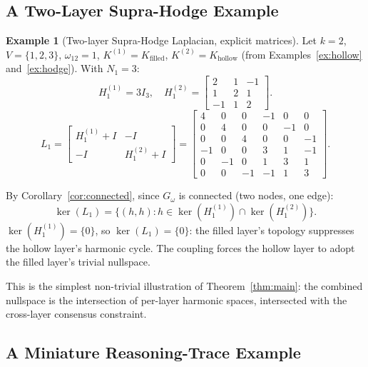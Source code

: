 \documentclass[11pt]{article}
\theoremstyle{definition}
\newtheorem{example}[theorem]{Example}
\theoremstyle{remark}
\newcommand{\Gom}{G_\omega}
\begin{document}
\subsection{A Two-Layer Supra-Hodge Example}

\begin{example}[Two-layer Supra-Hodge Laplacian, explicit matrices]
\label{ex:sh_main}
Let $k=2$, $V=\{1,2,3\}$, $\omega_{12}=1$, $K^{(1)}=K_{\mathrm{filled}}$,
$K^{(2)}=K_{\mathrm{hollow}}$ (from Examples~\ref{ex:hollow}
and~\ref{ex:hodge}). With $N_1=3$:
\[
  H_1^{(1)} = 3I_3,\quad
  H_1^{(2)} = \begin{bmatrix}2&1&-1\\1&2&1\\-1&1&2\end{bmatrix}.
\]
\[
  L_1 =
  \begin{bmatrix}
    H_1^{(1)}+I & -I\\
    -I & H_1^{(2)}+I
  \end{bmatrix}
  =
  \begin{bmatrix}
    4 & 0 & 0 & -1 & 0 & 0\\
    0 & 4 & 0 & 0 & -1 & 0\\
    0 & 0 & 4 & 0 & 0 & -1\\
    -1& 0 & 0 & 3 & 1 & -1\\
    0 &-1 & 0 & 1 & 3 & 1\\
    0 & 0 &-1 &-1 & 1 & 3
  \end{bmatrix}.
\]

By Corollary~\ref{cor:connected}, since $\Gom$ is connected (two nodes, one
edge):
\[
  \ker(L_1) = \{(h,h):h\in\ker(H_1^{(1)})\cap\ker(H_1^{(2)})\}.
\]
$\ker(H_1^{(1)})=\{0\}$, so $\ker(L_1)=\{0\}$: the filled layer's topology
suppresses the hollow layer's harmonic cycle. The coupling forces the hollow
layer to adopt the filled layer's trivial nullspace.
\end{example}

This is the simplest non-trivial illustration of Theorem~\ref{thm:main}: the
combined nullspace is the intersection of per-layer harmonic spaces, intersected
with the cross-layer consensus constraint.

\subsection{A Miniature Reasoning-Trace Example}
\end{document}
